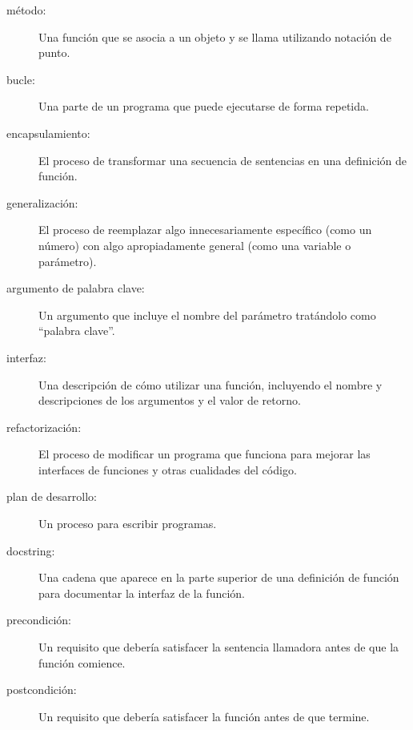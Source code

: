 \documentclass[10pt]{book}
\begin{document}
\begin{description}

\item[método:] Una función que se asocia a un objeto y se llama
utilizando notación de punto.

\item[bucle:] Una parte de un programa que puede ejecutarse de forma repetida.

\item[encapsulamiento:] El proceso de transformar una secuencia de
sentencias en una definición de función.

\item[generalización:] El proceso de reemplazar algo
innecesariamente específico (como un número) con algo apropiadamente
general (como una variable o parámetro).

\item[argumento de palabra clave:] Un argumento que incluye el nombre del
parámetro tratándolo como ``palabra clave''.

\item[interfaz:] Una descripción de cómo utilizar una función, incluyendo
el nombre y descripciones de los argumentos y el valor de retorno.

\item[refactorización:] El proceso de modificar un programa que funciona para
  mejorar las interfaces de funciones y otras cualidades del código.

\item[plan de desarrollo:] Un proceso para escribir programas.

\item[docstring:] Una cadena que aparece en la parte superior de una definición
  de función para documentar la interfaz de la función.

\item[precondición:] Un requisito que debería satisfacer la
sentencia llamadora antes de que la función comience.

\item[postcondición:] Un requisito que debería satisfacer la
función antes de que termine.

\end{description}
\end{document}
